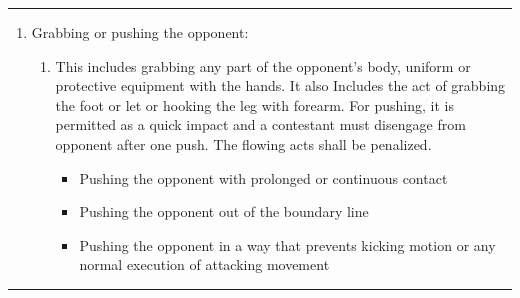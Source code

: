 \documentclass[draft]{report}
\providecommand{\tightlist}{%
  \setlength{\itemsep}{0pt}\setlength{\parskip}{0pt}}
\renewcommand{\labelenumii}{\arabic{enumi}.\arabic{enumii}}
\newenvironment{expl}[0]%
  {\rule{\textwidth}{.2pt}\footnotesize}%
  {\rule{\textwidth}{.2pt}\normalsize}
\begin{document}
\begin{expl}
\begin{enumerate}
\begin{enumerate}
\def\labelenumii{\alph{enumii})}
\item
  This act involves stalling with no intention of attacking. A
  contestant who continuously displays a non-engaging style shall be
  given a ``Gam-jeom''. If both contestants remain inactive after three
  (3) seconds, the center referee will signal the ``\,``Gong-gyeok''
  command. A ``Gam-jeom'' will be declared: On both contestants if there
  is no activity from them three (3) seconds after the command was
  given; or on the contestant who moved backwards from the original
  position three (3) seconds after the command was given.
\item
  Turning the back and move away to avoid the opponent's attack should
  be punished as it expresses the lack of a spirit of fair play and may
  cause serious injury. The same penalty should also be given for
  evading the opponent's attack by bending below waist level or
  crouching.
\item
  Retreating from the technical engagement only to avoid the opponent's
  attack and to run out the clock, ``Gam-jeom'' shall be given to the
  passive contestant.
\item
  Pretending injury means exaggerating injury or indicating pain in a
  body part not subjected to a blow for the purpose of demonstrating the
  opponent's actions as a violation, and also exaggerating pain for the
  purpose of elapsing the match time.
\item
  ``Gam-jeom'' shall also be given to the athlete who asks the referee
  to stop the contest in order to adjust the position/fit of protective
  equipment.
\end{enumerate}

\item
  Grabbing or pushing the opponent:

\begin{enumerate}
\def\labelenumii{\alph{enumii})}
\item
  This includes grabbing any part of the opponent's body, uniform or
  protective equipment with the hands. It also Includes the act of
  grabbing the foot or let or hooking the leg with forearm. For pushing,
  it is permitted as a quick impact and a contestant must disengage from
  opponent after one push. The flowing acts shall be penalized.

    \begin{itemize}
    \tightlist
    \item
      Pushing the opponent with prolonged or continuous contact
    \item
      Pushing the opponent out of the boundary line
    \item
      Pushing the opponent in a way that prevents kicking motion or any
      normal execution of attacking movement
    \end{itemize}


\end{enumerate}
\end{enumerate}
\end{expl}
\end{document}
